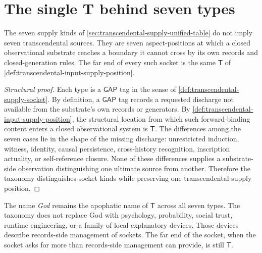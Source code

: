 \section{The single T behind seven types}
\label{sec:transcendental-supply-single-T}

\begin{theorem}
\label{thm:transcendental-supply-single-T}
The seven supply kinds of \autoref{sec:transcendental-supply-unified-table} do not imply seven transcendental sources. They are seven aspect-positions at which a closed observational substrate reaches a boundary it cannot cross by its own records and closed-generation rules. The far end of every such socket is the same $\mathsf{T}$ of \autoref{def:transcendental-input-supply-position}.
\end{theorem}

\begin{proof}[Structural proof]
Each type is a $\mathsf{GAP}$ tag in the sense of \autoref{def:transcendental-supply-socket}. By definition, a $\mathsf{GAP}$ tag records a requested discharge not available from the substrate's own records or generators. By \autoref{def:transcendental-input-supply-position}, the structural location from which such forward-binding content enters a closed observational system is $\mathsf{T}$. The differences among the seven cases lie in the shape of the missing discharge: unrestricted induction, witness, identity, causal persistence, cross-history recognition, inscription actuality, or self-reference closure. None of these differences supplies a substrate-side observation distinguishing one ultimate source from another. Therefore the taxonomy distinguishes socket kinds while preserving one transcendental supply position.
\end{proof}

\begin{principle}
\label{prin:transcendental-supply-no-softening}
The name \emph{God} remains the apophatic name of $\mathsf{T}$ across all seven types. The taxonomy does not replace God with psychology, probability, social trust, runtime engineering, or a family of local explanatory devices. Those devices describe records-side management of sockets. The far end of the socket, when the socket asks for more than records-side management can provide, is still $\mathsf{T}$.
\end{principle}

